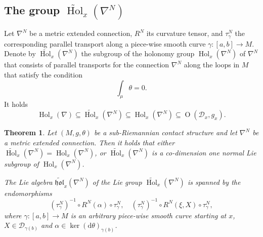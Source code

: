 \documentclass{amsart}
\theoremstyle{plain}
\newtheorem{theorem}{Theorem}[section]
\theoremstyle{definition}
\newcommand{\Hol}{\operatorname{Hol}}
\newcommand{\Or}{\operatorname{O}}
\newcommand{\hol}{\mathfrak{hol}}
\newcommand{\1}{\mathbf{1}}
\newcommand{\D}{{\mathcal D}}
\renewcommand{\d}{\mathrm{d}}
\newcommand{\+}{\oplus}
\newcommand{\N}{N}
\newcommand{\acom}[1]{
 \marginpar{{\scriptsize A: #1 }}}
\begin{document}

\subsection{The group $\widetilde{\Hol}_x(\nabla^N)$}
\label{tildehol-sec}

Let $\nabla^N$ be a metric extended connection, $R^\N$ its curvature tensor, and $\tau^\N_\gamma$ the corresponding parallel transport along a piece-wise smooth curve $\gamma:[a,b]\to M$.
Denote by $\widetilde{\Hol}_x(\nabla^N)$ the subgroup of the holonomy group   ${\Hol}_x(\nabla^N)$ of $\nabla^N$ that consists of parallel transports for the connection $\nabla^N$ along the loops in $M$ that satisfy the condition
\begin{equation}\label{condintegr0}\int_\mu\theta=0.\end{equation}
It holds 
$${\Hol}_x(\nabla)\subseteq\widetilde{\Hol}_x(\nabla^N)\subseteq {\Hol}_x(\nabla^N) \subseteq \Or(\D_x,g_x).$$ 

\begin{theorem} \label{theorHoltild}
Let $(M,g,\theta)$ be a sub-Riemannian contact structure and let $\nabla^N$ be a metric extended connection.
Then	 it holds that either $\widetilde{\Hol}_x(\nabla^N)={\Hol}_x(\nabla^N)$, or $\widetilde{\Hol}_x(\nabla^N)$ is a co-dimension one  normal Lie subgroup of  ${\Hol}_x(\nabla^N)$.

		The Lie algebra $\widetilde{\hol}_x(\nabla^N)$  of the Lie group $\widetilde{\Hol}_x(\nabla^N)$  is spanned by the endomorphisms
	$$(\tau^N_\gamma)^{-1}\circ R^N(\alpha)\circ\tau^N_\gamma,\quad (\tau_\gamma^N)^{-1}\circ R^N(\xi,X)\circ\tau^N_\gamma, $$
	where $\gamma:[a,b]\to M$ is an arbitrary piece-wise smooth curve starting at $x$,  $X\in \D_{\gamma(b)} $ and $\alpha\in \ker(\d\theta)_{\gamma(b)}$.
\end{theorem}


\end{document}
